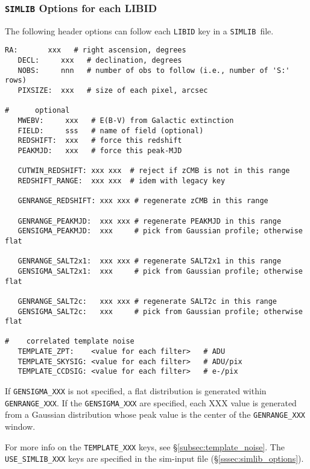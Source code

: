 \documentclass[12pt]{article}
\newcommand{\simlib}{{\tt SIMLIB}}
\begin{document}
{%
\clearpage
\subsubsection{{\simlib} Options for each LIBID}
\label{sssec:libid_options}

The following header options can follow each {\tt LIBID} key 
in a \simlib\ file.

\begin{Verbatim}[frame=single]
   RA:       xxx   # right ascension, degrees
   DECL:     xxx   # declination, degrees
   NOBS:     nnn   # number of obs to follow (i.e., number of 'S:' rows)
   PIXSIZE:  xxx   # size of each pixel, arcsec

#      optional
   MWEBV:     xxx   # E(B-V) from Galactic extinction
   FIELD:     sss   # name of field (optional)
   REDSHIFT:  xxx   # force this redshift 
   PEAKMJD:   xxx   # force this peak-MJD 

   CUTWIN_REDSHIFT: xxx xxx  # reject if zCMB is not in this range
   REDSHIFT_RANGE:  xxx xxx  # idem with legacy key

   GENRANGE_REDSHIFT: xxx xxx # regenerate zCMB in this range

   GENRANGE_PEAKMJD:  xxx xxx # regenerate PEAKMJD in this range
   GENSIGMA_PEAKMJD:  xxx     # pick from Gaussian profile; otherwise flat

   GENRANGE_SALT2x1:  xxx xxx # regenerate SALT2x1 in this range
   GENSIGMA_SALT2x1:  xxx     # pick from Gaussian profile; otherwise flat

   GENRANGE_SALT2c:   xxx xxx # regenerate SALT2c in this range
   GENSIGMA_SALT2c:   xxx     # pick from Gaussian profile; otherwise flat

#    correlated template noise
   TEMPLATE_ZPT:    <value for each filter>   # ADU     
   TEMPLATE_SKYSIG: <value for each filter>   # ADU/pix 
   TEMPLATE_CCDSIG: <value for each filter>   # e-/pix  
\end{Verbatim}
%
\noindent
If {\tt GENSIGMA\_XXX} is not specified, a flat distribution is generated
within {\tt GENRANGE\_XXX}.
If the {\tt GENSIGMA\_XXX} are specified, each XXX value
is generated from a Gaussian distribution whose peak value
is the center of the {\tt GENRANGE\_XXX} window.

For more info on the {\tt TEMPLATE\_XXX} keys, 
see \S\ref{subsec:template_noise}. 
The {\tt USE\_SIMLIB\_XXX} keys are specified in the sim-input file
(\S\ref{sssec:simlib_options}).

}
\end{document}
